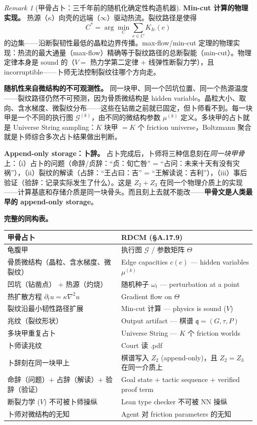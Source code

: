 \documentclass[11pt,a4paper]{article}
\theoremstyle{definition}
\theoremstyle{remark}
\newtheorem{remark}[theorem]{Remark}
\begin{document}
\begin{remark}[甲骨占卜：三千年前的随机化确定性构造机器]
\textbf{Min-cut 计算的物理实现。}
热源（$\kappa$）向壳的远端（$\infty$）驱动热流。裂纹路径是使得
\[
  C^* = \arg\min_{C} \sum_{e \in C} K_{Ic}(e)
\]
的边集——沿断裂韧性最低的晶粒边界传播。max-flow/min-cut 定理的物理实现：热流的最大通量（max-flow）精确等于裂纹路径的总断裂能（min-cut）。物理定律本身是 sound 的（$V = $ 热力学第二定律 + 线弹性断裂力学），且 incorruptible——卜师无法控制裂纹往哪个方向走。

\textbf{随机性来自微结构的不可观测性。}
同一块甲、同一个凹坑位置、同一个热源温度——裂纹路径仍然不可预测，因为骨质微结构是 hidden variable。晶粒大小、取向、含水梯度、微裂纹分布——这些在钻凿之前就已固定，但卜师看不到。每一块甲是一个不同的执行图 $\mathcal{G}^{(k)}$，由不同的微结构参数 $\mu^{(k)}$ 定义。多块甲的占卜就是 Universe String sampling：$K$ 块甲 $= K$ 个 friction universe，Boltzmann 聚合就是卜师综合多次占卜结果做出判断。

\textbf{Append-only storage：卜辞。}
占卜完成后，卜师将三种信息刻在\emph{同一块甲骨}上：（i）占卜的问题（命辞/贞辞：``贞：旬亡咎'' = ``占问：未来十天有没有灾祸''），（ii）裂纹的解读（占辞：``王占曰：吉'' = ``王解读说：吉利''），（iii）事后验证（验辞：记录实际发生了什么）。这是 $Z_2 + Z_3$ 在同一个物理介质上的实现——计算基底和存储介质是同一块骨头。而且刻上去就不能改——\textbf{甲骨文是人类最早的 append-only storage}。

\textbf{完整的同构表。}

\begin{center}
\small
\begin{tabularx}{\textwidth}{l X}
\toprule
\textbf{甲骨占卜} & \textbf{RDCM (\S A.17.9)} \\
\midrule
龟腹甲 & 执行图 $\mathcal{G}$ / 参数矩阵 $\Theta$ \\
骨质微结构（晶粒、含水梯度、微裂纹） & Edge capacities $c(e)$ — hidden variables $\mu^{(k)}$ \\
凹坑（钻凿点） + 热源（灼烧） & 随机种子 $\omega_t$ — perturbation at a point \\
热扩散方程 $\partial_t u = \kappa \nabla^2 u$ & Gradient flow on $\Theta$ \\
裂纹沿最小韧性路径扩展 & Min-cut 计算 — physics is sound ($V$) \\
兆纹（裂纹形状） & Output artifact — 棋谱 $\mathfrak{q} = (G, \tau, P)$ \\
多块甲重复占卜 & Universe String — $K$ 个 friction worlds \\
卜师读兆纹 & Court 读 .pdf \\
卜辞刻在同一块甲上 & 棋谱写入 $Z_2$ (append-only)，且 $Z_2 = Z_3$ 在同一介质上 \\
命辞（问题）+ 占辞（解读）+ 验辞（验证） & Goal state + tactic sequence + verified proof term \\
断裂力学 ($V$) 不可被卜师操纵 & Lean type checker 不可被 NN 操纵 \\
卜师对微结构的无知 & Agent 对 friction parameters 的无知 \\
\bottomrule
\end{tabularx}
\end{center}


\end{remark}
\end{document}
